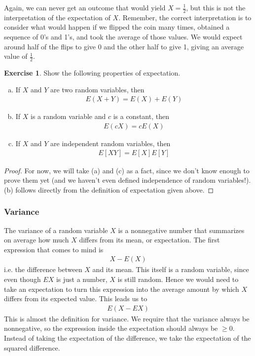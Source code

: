 \documentclass[11pt,letterpaper]{article}
\numberwithin{theorem}{section}
\numberwithin{definition}{section}
\numberwithin{lemma}{section}
\numberwithin{corollary}{section}
\numberwithin{proposition}{section}
\theoremstyle{definition}
\numberwithin{remark}{section}
\numberwithin{claim}{section}
\numberwithin{observation}{section}
\numberwithin{fact}{section}
\numberwithin{assumption}{section}
\numberwithin{example}{section}
\newtheorem{exercise}[theorem]{Exercise}
\numberwithin{exercise}{section}
\begin{document}
Again, we can never get an outcome that would yield $X = \frac{1}{2}$, but this is not the interpretation of the expectation of $X$. Remember, the correct interpretation is to consider what would happen if we flipped the coin many times, obtained a sequence of 0's and 1's, and took the average of those values. We would expect around half of the flips to give 0 and the other half to give 1, giving an average value of $\frac{1}{2}$.

\begin{exercise}
Show the following properties of expectation.
\begin{enumerate}[(a)]
\item If $X$ and $Y$ are two random variables, then
\begin{align*}
E(X + Y) = E(X) + E(Y)
\end{align*}

\item If $X$ is a random variable and $c$ is a constant, then
\begin{align*}
E(cX) = cE(X)
\end{align*}

\item If $X$ and $Y$ are independent random variables, then
\begin{align*}
    E[XY] = E[X]E[Y]
\end{align*}
\end{enumerate}
\end{exercise}

\begin{proof}
For now, we will take (a) and (c) as a fact, since we don't know enough to prove them yet (and we haven't even defined independence of random variables!). (b) follows directly from the definition of expectation given above.
\end{proof}

\subsubsection{Variance}
The variance of a random variable $X$ is a nonnegative number that summarizes on average how much $X$ differs from its mean, or expectation. The first expression that comes to mind is 
\begin{align*}
X - E(X)
\end{align*}
i.e. the difference between $X$ and its mean. This itself is a random variable, since even though $EX$ is just a number, $X$ is still random. Hence we would need to take an expectation to turn this expression into the average amount by which $X$ differs from its expected value. This leads us to
\begin{align*}
E(X-EX)
\end{align*}
This is almost the definition for variance. We require that the variance always be nonnegative, so the expression inside the expectation should always be $\geq 0$. Instead of taking the expectation of the difference, we take the expectation of the squared difference.
\end{document}

